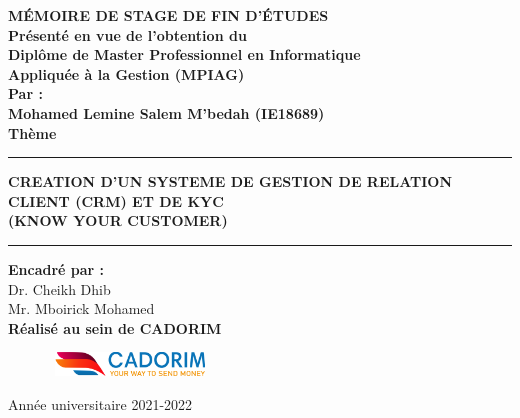 \documentclass[a4paper, 12pt]{report}
\begin{document}
\begin{titlepage}
\begin{center}
			\bf{MÉMOIRE DE STAGE DE FIN D'ÉTUDES} \\
			\vspace{1cm}
			{\bf Présenté en vue de l’obtention du } \vspace{-0.2cm}\\
			{\bf Diplôme de Master Professionnel en Informatique}\vspace{-0.2cm}\\
				{\bf	Appliquée à la Gestion (MPIAG)}\\ \vspace{0.2cm}
				{\bf Par :}\\ \vspace{0.2cm}
					{\bf Mohamed Lemine Salem M’bedah (IE18689) }\\ \vspace{0.2cm}
			\huge{\textbf{Thème}}\\ 
			\noindent\rule{\textwidth}{1mm}
			\Large{\bf{CREATION D’UN SYSTEME DE GESTION DE RELATION CLIENT (CRM)  ET DE KYC  \\ (KNOW YOUR CUSTOMER)}}
			\noindent\rule{\textwidth}{1mm}
		\end{center}
		\vspace{0cm}
		\begin{center}
			
			{\bf Encadré par :}\\
			{Dr. Cheikh Dhib} \\
			{Mr. Mboirick Mohamed} \\
			{\bf Réalisé au sein de CADORIM }
			
			
		\end{center}
		\begin{figure}[htbp]
		\hbox{
			\hspace*{5cm}
			\includegraphics[width=150px]{./Template LaTeX/Images/cado_logo.png}
		}
		\end{figure}
		
		\begin{center}
			Année universitaire 2021-2022
		\end{center}
	\end{titlepage}
\end{document}
